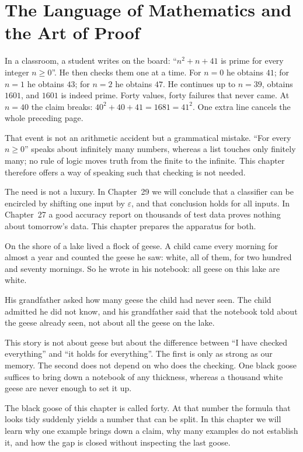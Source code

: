 \chapter{The Language of Mathematics and the Art of Proof}

In a classroom, a student writes on the board: ``$n^{2}+n+41$ is prime for every
integer $n \geq 0$''. He then checks them one at a time. For $n=0$ he obtains
$41$; for $n=1$ he obtains $43$; for $n=2$ he obtains $47$. He continues up to
$n=39$, obtains $1601$, and $1601$ is indeed prime. Forty values, forty
failures that never came. At $n=40$ the claim breaks:
$40^{2}+40+41 = 1681 = 41^{2}$. One extra line cancels the whole preceding page.

That event is not an arithmetic accident but a grammatical mistake. ``For every
$n \geq 0$'' speaks about infinitely many numbers, whereas a list touches only
finitely many; no rule of logic moves truth from the finite to the infinite. This
chapter therefore offers a way of speaking such that checking is not needed.

The need is not a luxury. In Chapter~29 we will conclude that a
classifier can be encircled by shifting one input by $\varepsilon$,
and that conclusion holds for all inputs. In Chapter~27 a good accuracy report on
thousands of test data proves nothing about tomorrow's data. This chapter prepares
the apparatus for both.

\begin{untukanak}
On the shore of a lake lived a flock of geese. A child came every morning for
almost a year and counted the geese he saw: white, all of them, for two hundred
and seventy mornings. So he wrote in his notebook: all geese on this lake are white.

His grandfather asked how many geese the child had never seen. The child admitted he
did not know, and his grandfather said that the notebook told about the geese already
seen, not about all the geese on the lake.

This story is not about geese but about the difference between ``I have checked
everything'' and ``it holds for everything''. The first is only as strong as our memory. The second does not depend on who does the checking. One black goose
suffices to bring down a notebook of any thickness, whereas a thousand white geese
are never enough to set it up.

The black goose of this chapter is called forty. At that number the formula that looks tidy
suddenly yields a number that can be split. In this chapter we will learn why one
example brings down a claim, why many examples do not establish it, and how the gap
is closed without inspecting the last goose.
\end{untukanak}

